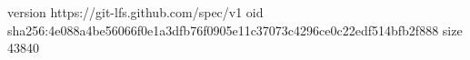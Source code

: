 version https://git-lfs.github.com/spec/v1
oid sha256:4e088a4be56066f0e1a3dfb76f0905e11c37073c4296ce0c22edf514bfb2f888
size 43840

